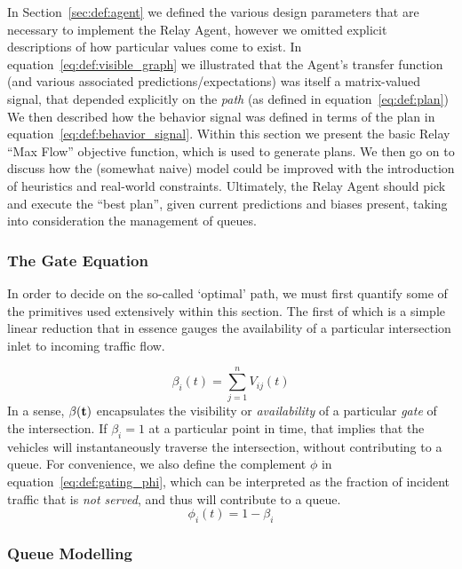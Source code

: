 \documentclass{report}
\begin{document}
In Section~\ref{sec:def:agent} we defined the various design parameters that are necessary to implement the Relay Agent, however we omitted explicit descriptions of how particular values come to exist.
In equation~\eqref{eq:def:visible_graph} we illustrated that the Agent's transfer function (and various associated predictions/expectations) was itself a matrix-valued signal, that depended explicitly on the \emph{path} (as defined in equation~\eqref{eq:def:plan})
We then described how the behavior signal was defined in terms of the plan in equation~\eqref{eq:def:behavior_signal}.
Within this section we present the basic Relay ``Max Flow'' objective function, which is used to generate plans.
We then go on to discuss how the (somewhat naive) model could be improved with the introduction of heuristics and real-world constraints.
Ultimately, the Relay Agent should pick and execute the ``best plan'', given current predictions and biases present, taking into consideration the management of queues.

\subsubsection{The Gate Equation}
\label{sec:opt:gating}

In order to decide on the so-called `optimal' path, we must first quantify some of the primitives used extensively within this section.
The first of which is a simple linear reduction that in essence gauges the availability of a particular intersection inlet to incoming traffic flow.

\begin{equation}\label{eq:def:gating_beta}
	\beta_i(t) = \sum_{j=1}^n V_{ij}(t)
\end{equation}
In a sense, $\bf{\beta}(t)$ encapsulates the visibility or \emph{availability} of a particular \emph{gate} of the intersection.
If $\beta_i = 1$ at a particular point in time, that implies that the vehicles will instantaneously traverse the intersection, without contributing to a queue.
For convenience, we also define the complement $\phi$ in equation~\eqref{eq:def:gating_phi}, which can be interpreted as the fraction of incident traffic that is \emph{not served}, and thus will contribute to a queue.
\begin{equation}\label{eq:def:gating_phi}
	\phi_i(t) = 1 - \beta_i
\end{equation}

\subsubsection{Queue Modelling}
\end{document}
